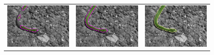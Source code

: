 \documentclass[runningheads]{llncs}
\begin{document}
\begin{figure}
\begin{tabular}{ccc}
		\includegraphics[scale=0.2]{images/segmentation/snake/gc-seg.png} &
		\includegraphics[scale=0.2]{images/segmentation/snake/corrected-seg.png} &
		\includegraphics[scale=0.2]{images/segmentation/schoenemann/snake/snake-seg.png}\\						

\end{tabular}
\end{figure}
\end{document}
